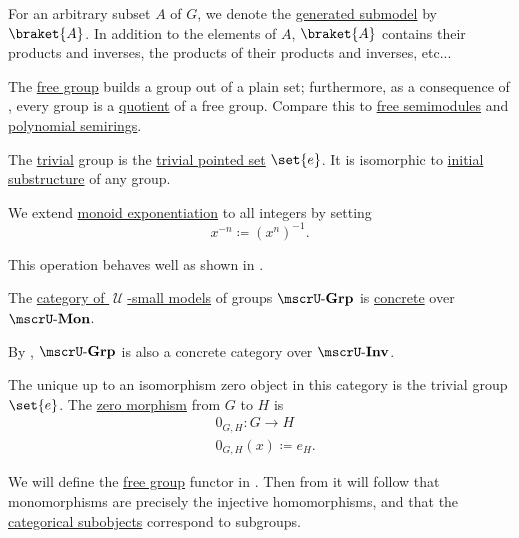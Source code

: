 \begin{definition}
\begin{thmenum}
    For an arbitrary subset \( A \) of \( G \), we denote the \hyperref[def:first_order_generated_substructure]{generated submodel} by \( \braket{ A } \). In addition to the elements of \( A \), \( \braket{ A } \) contains their products and inverses, the products of their products and inverses, etc...

    The \hyperref[def:free_group]{free group} builds a group out of a plain set; furthermore, as a consequence of , every group is a \hyperref[def:group/quotient]{quotient} of a free group. Compare this to \hyperref[def:free_semimodule]{free semimodules} and \hyperref[def:polynomial_algebra]{polynomial semirings}.

     The \hyperref[def:trivial_structure]{trivial} group is the \hyperref[rem:pointed_set/trivial]{trivial pointed set} \( \set{ e } \). It is isomorphic to \hyperref[thm:substructures_form_complete_lattice/bottom]{initial substructure} of any group.

     We extend \hyperref[def:monoid/exponentiation]{monoid exponentiation} to all integers by setting
    \begin{equation*}
      x^{-n} \coloneqq (x^n)^{-1}.
    \end{equation*}

    This operation behaves well as shown in .

     The \hyperref[def:category_of_small_first_order_models]{category of \( \mscrU \)-small models} of groups \( \ucat{Grp} \) is \hyperref[def:concrete_category]{concrete} over \hyperref[def:monoid]{\( \ucat{Mon} \)}.

    By , \( \ucat{Grp} \) is also a concrete category over \( \ucat{Inv} \).

    The unique up to an isomorphism zero object in this category is the trivial group \( \set{ e } \). The \hyperref[def:zero_morphisms/morphism]{zero morphism} from \( G \) to \( H \) is
    \begin{equation*}
      \begin{aligned}
        &0_{G,H}: G \to H \\
        &0_{G,H}(x) \coloneqq e_H.
      \end{aligned}
    \end{equation*}

    We will define the \hyperref[def:free_group]{free group} functor in . Then from  it will follow that monomorphisms are precisely the injective homomorphisms, and that the \hyperref[def:subobject_and_quotient]{categorical subobjects} correspond to subgroups.


\end{thmenum}
\end{definition}
